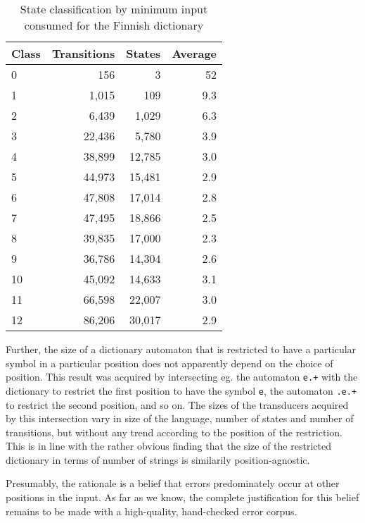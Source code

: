 \documentclass[11pt]{article}
\begin{document}
\begin{table}[h]
\begin{center}
\begin{scriptsize}
\begin{tabular}{|l|rrr|}
\hline
\bf Class & \bf Transitions & \bf States & \bf Average \\ 
\hline
0 & 156 & 3 & 52 \\
1 & 1,015 & 109 & 9.3 \\
2 & 6,439 & 1,029 & 6.3 \\
3 & 22,436 & 5,780 & 3.9 \\
4 & 38,899 & 12,785 & 3.0 \\
5 & 44,973 & 15,481 & 2.9 \\
6 & 47,808 & 17,014 & 2.8 \\
7 & 47,495 & 18,866 & 2.5 \\
8 & 39,835 & 17,000 & 2.3 \\
9 & 36,786 & 14,304 & 2.6 \\
10 & 45,092 & 14,633 & 3.1 \\
11 & 66,598 & 22,007 & 3.0 \\
12 & 86,206 & 30,017 & 2.9 \\
\hline
\end{tabular}
\end{scriptsize}
\end{center}
\caption{\label{table:fi-state-classification}
State classification by minimum input consumed for the Finnish dictionary}
\end{table}

Further, the size of a dictionary automaton that is restricted to have
a particular symbol in a particular position does not apparently depend on the
choice of position. This result was acquired by intersecting eg. the automaton
\texttt{e.+} with the dictionary to restrict the first
position to have the symbol
\texttt{e}, the automaton
\texttt{.e.+} to restrict the second position, and so on.
The sizes of the transducers acquired by this intersection vary in size of the
language, number of states and number of transitions, but without any trend
according to the position of the restriction.
This is in line with the rather obvious finding that the
size of the restricted dictionary in terms of number of strings is similarily
position-agnostic.

Presumably, the rationale is a belief that errors predominately occur at other
positions in the input. As far as we know, the complete justification for this
belief remains to be made with a high-quality, hand-checked error corpus.
\end{document}
